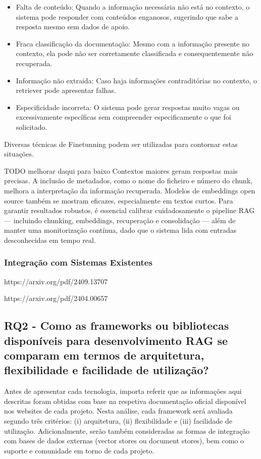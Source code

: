 \begin{itemize}
    \item Falta de conteúdo: Quando a informação necessária não está no contexto, o sistema pode responder com conteúdos enganosos, sugerindo que sabe a resposta mesmo sem dados de apoio.
    \item Fraca classificação da documentação: Mesmo com a informação presente no contexto, ela pode não ser corretamente classificada e consequentemente não recuperada. 
 \item Informação não extraida: Caso haja informações contraditórias no contexto, o retriever pode apresentar falhas.
  \item Especificidade incorreta: O sistema pode gerar respostas muito vagas ou excessivamente específicas sem compreender especificamente o que foi solicitado.
\end{itemize}

Diversas técnicas de Finetunning podem ser utilizadas para contornar estas situações.

TODO melhorar daqui para baixo
Contextos maiores geram respostas mais precisas. A inclusão de metadados, como o nome do ficheiro e número do chunk, melhora a interpretação da informação recuperada. Modelos de embeddings open source também se mostram eficazes, especialmente em textos curtos. Para garantir resultados robustos, é essencial calibrar cuidadosamente o pipeline RAG — incluindo chunking, embeddings, recuperação e consolidação — além de manter uma monitorização contínua, dado que o sistema lida com entradas desconhecidas em tempo real.



\subsubsection{Integração com Sistemas Existentes}




https://arxiv.org/pdf/2409.13707

https://arxiv.org/pdf/2404.00657


\subsection{RQ2 - Como as frameworks ou bibliotecas disponíveis para desenvolvimento RAG se comparam em termos de arquitetura, flexibilidade e facilidade de utilização?}

Antes de apresentar cada tecnologia, importa referir que as informações aqui descritas foram obtidas com base na respetiva documentação oficial disponível nos websites de cada projeto. Nesta análise, cada framework será avaliada segundo três critérios: (i) arquitetura, (ii) flexibilidade e (iii) facilidade de utilização. Adicionalmente, serão também consideradas as formas de integração com bases de dados externas (vector stores ou document stores), bem como o suporte e comunidade em torno de cada projeto.


